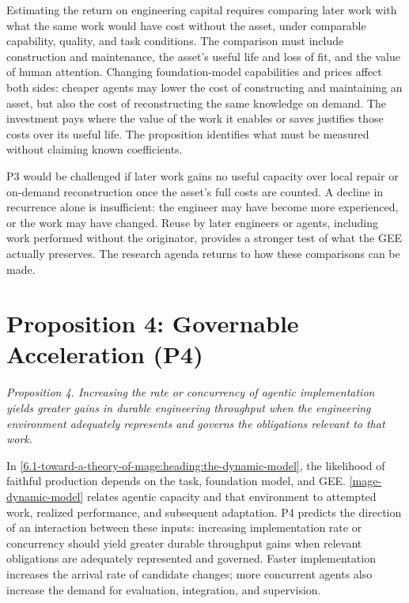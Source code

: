 Estimating the return on engineering capital requires comparing later work with what the same work would have cost without the asset, under comparable capability, quality, and task conditions. The comparison must include construction and maintenance, the asset's useful life and loss of fit, and the value of human attention. Changing foundation-model capabilities and prices affect both sides: cheaper agents may lower the cost of constructing and maintaining an asset, but also the cost of reconstructing the same knowledge on demand. The investment pays where the value of the work it enables or saves justifies those costs over its useful life. The proposition identifies what must be measured without claiming known coefficients.


P3 would be challenged if later work gains no useful capacity over local repair or on-demand reconstruction once the asset's full costs are counted. A decline in recurrence alone is insufficient: the engineer may have become more experienced, or the work may have changed. Reuse by later engineers or agents, including work performed without the originator, provides a stronger test of what the GEE actually preserves. The research agenda returns to how these comparisons can be made.

\section{Proposition 4: Governable Acceleration (P4)}\label{heading:p4-governable-acceleration}


\emph{Proposition 4. Increasing the rate or concurrency of agentic implementation yields greater gains in durable engineering throughput when the engineering environment adequately represents and governs the obligations relevant to that work.}

In \autoref{6.1-toward-a-theory-of-mage:heading:the-dynamic-model}, the likelihood of faithful production depends on the task, foundation model, and GEE. \autoref{mage-dynamic-model} relates agentic capacity and that environment to attempted work, realized performance, and subsequent adaptation. P4 predicts the direction of an interaction between these inputs: increasing implementation rate or concurrency should yield greater durable throughput gains when relevant obligations are adequately represented and governed. Faster implementation increases the arrival rate of candidate changes; more concurrent agents also increase the demand for evaluation, integration, and supervision.

